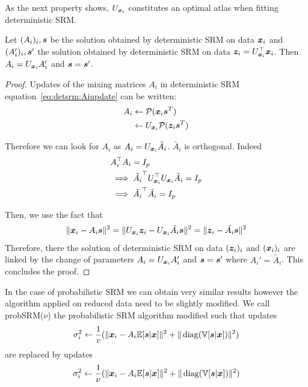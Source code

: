 As the next property shows, $U_{\boldsymbol{x}_i}$ constitutes an optimal atlas when
fitting deterministic SRM.
\begin{prop}
  Let $(A_i)_i, \boldsymbol{s}$ be the solution obtained by deterministic SRM on data
  $\boldsymbol{x}_i$ and $(A_i')_i, \boldsymbol{s}'$ the solution obtained by deterministic SRM on
  data $\boldsymbol{z}_i = U_{\boldsymbol{x}_i}^{\top} \boldsymbol{x}_i$. Then $A_i = U_{\boldsymbol{x}_i}A_i'$ and $\boldsymbol{s} = \boldsymbol{s}'$. 
\label{prop:optimaldetsrm}
\end{prop}
\begin{proof}
Updates of the mixing matrices $A_i$ in deterministic SRM
equation~\eqref{eq:detsrm:Aiupdate} can be written:
\begin{align}
  A_i &\leftarrow \mathcal{P}(\boldsymbol{x}_i \boldsymbol{s}^T) \\
      &\leftarrow U_{\boldsymbol{x}_i}\mathcal{P}(\boldsymbol{z}_i \boldsymbol{s}^T)
\end{align}

Therefore we can look for $A_i$ as $A_i = U_{\boldsymbol{x}_i} \tilde{A_i}$. $\tilde{A_i}$ is
orthogonal. Indeed
\begin{align}
  &A_i^{\top} A_i = I_p \\
  & \implies \tilde{A_i}^{\top}U_{\boldsymbol{x}_i}^{\top} U_{\boldsymbol{x}_i} \tilde{A_i} = I_p \\
  & \implies \tilde{A_i}^{\top} \tilde{A_i} = I_p
\end{align}

Then, we use the fact that
\begin{align}
  \|\boldsymbol{x}_i - A_i \boldsymbol{s} \|^2 = \| U_{\boldsymbol{x}_i}\boldsymbol{z}_i - U_{\boldsymbol{x}_i}\tilde{A_i} \boldsymbol{s}\|^2 = \| \boldsymbol{z}_i - \tilde{A_i} \boldsymbol{s} \|^2
  \label{eq:equality:xy}
\end{align}
Therefore, there the solution of deterministic SRM on data $(\boldsymbol{z}_i)_i$ and
$(\boldsymbol{x}_i)_i$ are linked by the change of parameters $A_i = U_{\boldsymbol{x}_i}A_i'$ and
$\boldsymbol{s} = \boldsymbol{s}'$ where $A_i' = \tilde{A_i}$. This concludes the proof.
\end{proof}
In the case of probabilistic SRM we can obtain very similar results however the
algorithm applied on reduced data need to be slightly modified.
We call probSRM($\nu$) the probabilistic SRM algorithm modified such that
updates
\begin{align}
\sigma_i^2 \leftarrow \frac1{v} (\| \boldsymbol{x}_i - A_i \mathbb{E}[\boldsymbol{s}|\boldsymbol{x}]\|^2 + \| \operatorname*{diag}(\mathbb{V}[\boldsymbol{s} | \boldsymbol{x}]) \|^2)
\end{align}
are replaced by updates
\begin{align}
  \sigma_i^2 \leftarrow \frac1{\nu} (\| \boldsymbol{x}_i - A_i \mathbb{E}[\boldsymbol{s}|\boldsymbol{x}]\|^2 + \| \operatorname*{diag}(\mathbb{V}[\boldsymbol{s} | \boldsymbol{x}]) \|^2)
\end{align}

